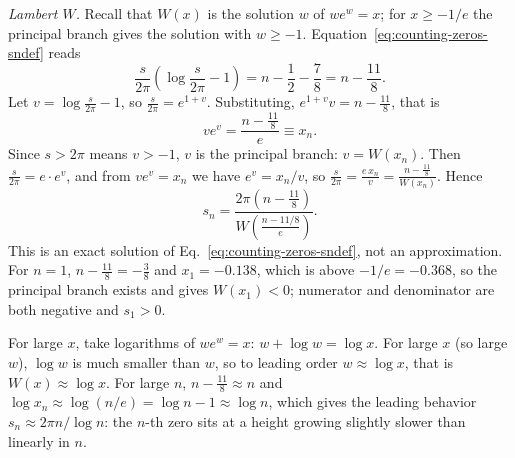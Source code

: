 \emph{Lambert $W$.} Recall that $W(x)$ is the solution $w$ of $we^w=x$; for $x\ge-1/e$ the principal branch gives the solution with $w\ge-1$. Equation~\eqref{eq:counting-zeros-sndef} reads
\begin{equation}
\frac{s}{2\pi}\left(\log\frac{s}{2\pi}-1\right)=n-\frac12-\frac78=n-\frac{11}{8}.
\end{equation}
Let $v=\log\frac{s}{2\pi}-1$, so $\frac{s}{2\pi}=e^{1+v}$. Substituting, $e^{1+v}v=n-\tfrac{11}8$, that is
\begin{equation}
ve^v=\frac{n-\frac{11}{8}}{e}\equiv x_n.
\end{equation}
Since $s>2\pi$ means $v>-1$, $v$ is the principal branch: $v=W(x_n)$. Then $\frac{s}{2\pi}=e\cdot e^{v}$, and from $ve^v=x_n$ we have $e^v=x_n/v$, so $\frac{s}{2\pi}=\frac{e\,x_n}{v}=\frac{n-\frac{11}8}{W(x_n)}$. Hence
\begin{equation}
\boxed{s_n=\frac{2\pi\left(n-\frac{11}{8}\right)}{W\!\left(\frac{n-11/8}{e}\right)}.}
\label{eq:counting-zeros-lambert}
\end{equation}
This is an exact solution of Eq.~\eqref{eq:counting-zeros-sndef}, not an approximation. For $n=1$, $n-\tfrac{11}{8}=-\tfrac38$ and $x_1=-0.138$, which is above $-1/e=-0.368$, so the principal branch exists and gives $W(x_1)<0$; numerator and denominator are both negative and $s_1>0$.

For large $x$, take logarithms of $we^w=x$: $w+\log w=\log x$. For large $x$ (so large $w$), $\log w$ is much smaller than $w$, so to leading order $w\approx\log x$, that is $W(x)\approx\log x$. For large $n$, $n-\tfrac{11}8\approx n$ and $\log x_n\approx\log(n/e)=\log n-1\approx\log n$, which gives the leading behavior $s_n\approx2\pi n/\log n$: the $n$-th zero sits at a height growing slightly slower than linearly in $n$.


